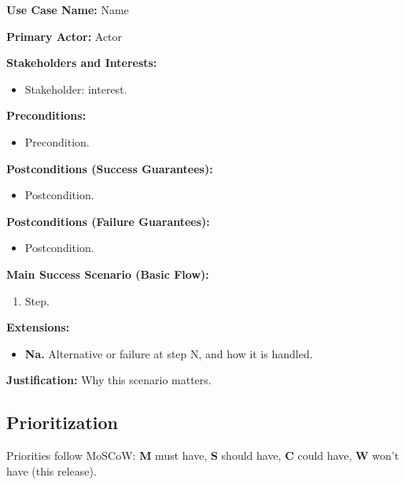 \documentclass[12pt]{article}
\begin{document}
\noindent\textbf{Use Case Name:} Name

\noindent\textbf{Primary Actor:} Actor

\noindent\textbf{Stakeholders and Interests:}
\begin{itemize}
    \item Stakeholder: interest.
\end{itemize}

\noindent\textbf{Preconditions:}
\begin{itemize}
    \item Precondition.
\end{itemize}

\noindent\textbf{Postconditions (Success Guarantees):}
\begin{itemize}
    \item Postcondition.
\end{itemize}

\noindent\textbf{Postconditions (Failure Guarantees):}
\begin{itemize}
    \item Postcondition.
\end{itemize}

\noindent\textbf{Main Success Scenario (Basic Flow):}
\begin{enumerate}
    \item Step.
\end{enumerate}

\noindent\textbf{Extensions:}
\begin{itemize}
    \item \textbf{Na.} Alternative or failure at step N, and how it is handled.
\end{itemize}

\noindent\textbf{Justification:} Why this scenario matters.

\subsection{Prioritization}\label{subsec:prioritization}

\noindent Priorities follow MoSCoW: \textbf{M} must have, \textbf{S} should
have, \textbf{C} could have, \textbf{W} won't have (this release).
\end{document}
